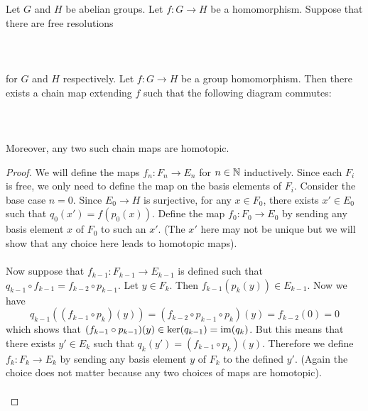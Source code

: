 \documentclass[a4paper]{article}
\begin{document}
\begin{prp}{}{} Let $G$ and $H$ be abelian groups. Let $f:G\to H$ be a homomorphism. Suppose that there are free resolutions \\~\\
\\~\\
for $G$ and $H$ respectively. Let $f:G\to H$ be a group homomorphism. Then there exists a chain map extending $f$ such that the following diagram commutes: \\~\\
\\~\\
Moreover, any two such chain maps are homotopic. \tcbline
\begin{proof}
We will define the maps $f_n:F_n\to E_n$ for $n\in\mathbb{N}$ inductively. Since each $F_i$ is free, we only need to define the map on the basis elements of $F_i$. Consider the base case $n=0$. Since $E_0\to H$ is surjective, for any $x\in F_0$, there exists $x'\in E_0$ such that $q_0(x')=f(p_0(x))$. Define the map $f_0:F_0\to E_0$ by sending any basis element $x$ of $F_0$ to such an $x'$. (The $x'$ here may not be unique but we will show that any choice here leads to homotopic maps). \\~\\

Now suppose that $f_{k-1}:F_{k-1}\to E_{k-1}$ is defined such that $q_{k-1}\circ f_{k-1}=f_{k-2}\circ p_{k-1}$. Let $y\in F_k$. Then $f_{k-1}(p_k(y))\in E_{k-1}$. Now we have $$q_{k-1}((f_{k-1}\circ p_k)(y))=(f_{k-2}\circ p_{k-1}\circ p_k)(y)=f_{k-2}(0)=0$$ which shows that $(f_{k-1}\circ p_{k-1})(y)\in\ker(q_{k-1})=\operatorname{im}(q_k)$. But this means that there exists $y'\in E_k$ such that $q_k(y')=(f_{k-1}\circ p_k)(y)$. Therefore we define $f_k:F_k\to E_k$ by sending any basis element $y$ of $F_k$ to the defined $y'$. (Again the choice does not matter because any two choices of maps are homotopic). \\~\\


\end{proof}
\end{prp}
\end{document}

